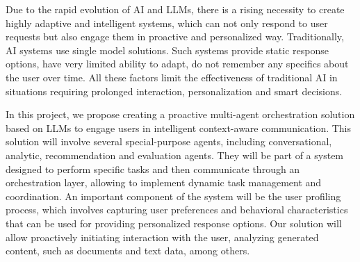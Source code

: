 
Due to the rapid evolution of AI and LLMs, there is a rising necessity to create highly adaptive and intelligent systems, which can not only respond to user requests but also engage them in proactive and personalized way. Traditionally, AI systems use single model solutions. Such systems provide static response options, have very limited ability to adapt, do not
remember any specifics about the user over time. All these factors limit the effectiveness of traditional AI in situations requiring prolonged interaction, personalization and smart decisions.

In this project, we propose creating a proactive multi-agent orchestration solution based on LLMs to engage users in intelligent context-aware communication. This solution will involve several special-purpose agents, including conversational, analytic, recommendation and evaluation agents. They will be part of a system designed to perform specific tasks and then communicate through an orchestration layer, allowing to implement dynamic task management and coordination. An important component of the system will be the user profiling process, which involves capturing user preferences and behavioral characteristics that can be used for providing personalized response options. Our solution will allow proactively initiating interaction with the user, analyzing generated content, such as documents and text data, among others.


